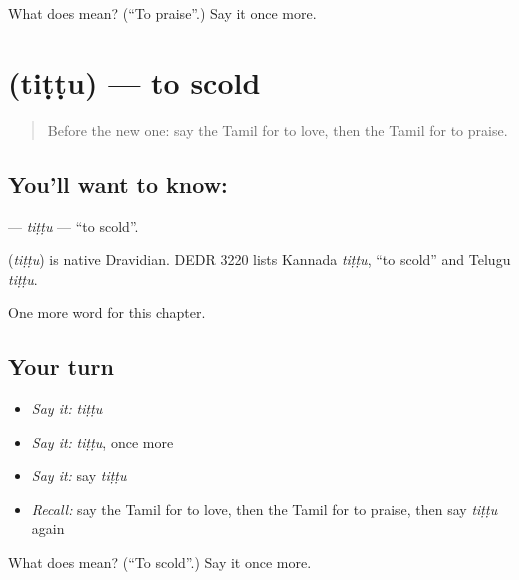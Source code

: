 \begin{tcolorbox}[breakable,colback=teal!4,colframe=teal!35!black,title={Before you move on}]
What does  mean? (\textquotedblleft{}To praise\textquotedblright{}.) Say it once more.
\end{tcolorbox}
\section[\texorpdfstring{\ta{திட்டு} (tiṭṭu)}{திட்டு (tiṭṭu)}]{ (tiṭṭu) — to scold}

\label{lesson:TA-C229-tittu}



\begin{quote}
Before the new one: say the Tamil for to love, then the Tamil for to praise.
\end{quote}

\subsection*{You'll want to know: }
\textbf{} — \emph{tiṭṭu} — \textquotedblleft{}to scold\textquotedblright{}.

\begin{cousinweb}
\textbf{} (\emph{tiṭṭu}) is native Dravidian. DEDR 3220 lists Kannada \emph{tiṭṭu}, \textquotedblleft{}to scold\textquotedblright{} and Telugu \emph{tiṭṭu}.
\end{cousinweb}

\begin{grammarlens}[title={What you've built}]
One more word for this chapter.
\end{grammarlens}

\subsection*{Your turn}
\begin{itemize}
\raggedright
  \item \emph{Say it:} \emph{tiṭṭu}
  \item \emph{Say it:} \emph{tiṭṭu}, once more
  \item \emph{Say it:} say \emph{tiṭṭu}
  \item \emph{Recall:} say the Tamil for to love, then the Tamil for to praise, then say \emph{tiṭṭu} again
\end{itemize}

\begin{tcolorbox}[breakable,colback=teal!4,colframe=teal!35!black,title={Before you move on}]
What does  mean? (\textquotedblleft{}To scold\textquotedblright{}.) Say it once more.
\end{tcolorbox}
